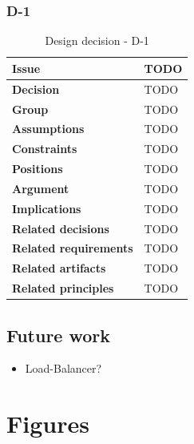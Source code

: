 \documentclass[11pt]{article}
\begin{document}
\newpage

\subsubsection{D-1}

\begin{table}[h] \small
	\begin{tabularx}{\textwidth}{ | l | X |}
    	\hline
	\cellcolor[gray]{0.9}
    	\textbf{Issue} & TODO \\
	\hline
	\cellcolor[gray]{0.9}
	\textbf{Decision} & TODO \\ 
	\hline
	\cellcolor[gray]{0.9}
	\textbf{Group} & TODO \\ 
	\hline
	\cellcolor[gray]{0.9}
	\textbf{Assumptions} & TODO \\ 
	\hline
	\cellcolor[gray]{0.9}
	\textbf{Constraints} & TODO \\ 
	\hline
	\cellcolor[gray]{0.9}
	\textbf{Positions} & TODO \\ 
	\hline
	\cellcolor[gray]{0.9}
	\textbf{Argument} & TODO \\ 
	\hline
	\cellcolor[gray]{0.9}
	\textbf{Implications} & TODO \\ 
	\hline
	\cellcolor[gray]{0.9}
	\textbf{Related decisions} & TODO \\ 
	\hline
	\cellcolor[gray]{0.9}
	\textbf{Related requirements} & TODO\\
	\hline
	\cellcolor[gray]{0.9}
	\textbf{Related artifacts} & TODO\\
	\hline
	\cellcolor[gray]{0.9}
	\textbf{Related principles} & TODO\\
	\hline
	\end{tabularx}
	\caption{Design decision - D-1}
	\label{dec:D1}
\end{table}

\subsection{Future work}

\begin{itemize}
\item Load-Balancer?
\end{itemize}

\newpage

\appendix
\section{Figures}
\end{document}
